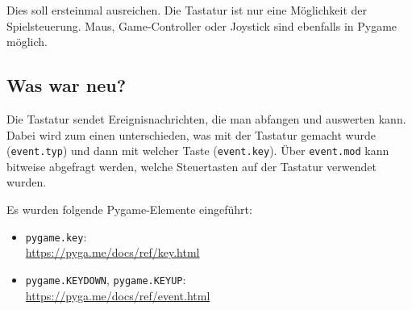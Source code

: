 Dies soll ersteinmal ausreichen. Die Tastatur ist nur eine Möglichkeit der Spielsteuerung. Maus, Game-Controller oder Joystick sind ebenfalls in Pygame möglich.

\subsection*{Was war neu?}
Die Tastatur sendet Ereignisnachrichten, die man abfangen und auswerten kann. Dabei wird zum einen unterschieden, was mit der Tastatur gemacht wurde (\texttt{event.typ}) und dann mit welcher Taste (\texttt{event.key}). Über \texttt{event.mod} kann bitweise abgefragt werden, welche Steuertasten auf der Tastatur verwendet wurden.

Es wurden folgende Pygame-Elemente eingeführt:


\begin{itemize}
	\item \texttt{pygame.key}:
	\\ \url{https://pyga.me/docs/ref/key.html}

	\item \texttt{pygame.KEYDOWN}, \texttt{pygame.KEYUP}:
	\\ \url{https://pyga.me/docs/ref/event.html}
	
\end{itemize}

